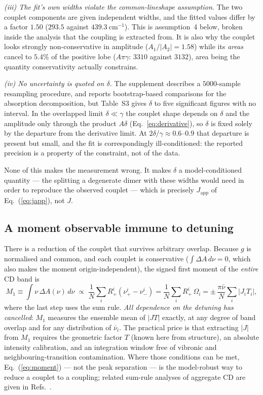 \documentclass[11pt,a4paper]{article}
\begin{document}
\emph{(iii) The fit's own widths violate the common-lineshape assumption.} The
two couplet components are given independent widths, and the fitted values
differ by a factor $1.50$ ($293.5$ against $439.3~\mathrm{cm^{-1}}$). This is
assumption~4 below, broken inside the analysis that the coupling is extracted
from. It is also why the couplet looks strongly non-conservative in amplitude
($A_{1}/|A_{2}|=1.58$) while its \emph{areas} cancel to $5.4\%$ of the positive
lobe ($A\pi\gamma$: $3310$ against $3132$), area being the quantity
conservativity actually constrains.

\emph{(iv) No uncertainty is quoted on $\delta$.} The supplement describes a
$5000$-sample resampling procedure, and reports bootstrap-based comparisons for
the absorption decomposition, but Table~S3 gives $\delta$ to five significant
figures with no interval. In the overlapped limit $\delta\ll\gamma$ the couplet
shape depends on $\delta$ and the amplitude only through the product $A\delta$
(Eq.~\ref{eq:derivative}), so $\delta$ is fixed solely by the departure from
the derivative limit. At $2\delta/\gamma\approx0.6$--$0.9$ that departure is
present but small, and the fit is correspondingly ill-conditioned: the reported
precision is a property of the constraint, not of the data.

None of this makes the measurement wrong. It makes $\delta$ a
model-conditioned quantity --- the splitting a degenerate dimer with these
widths would need in order to reproduce the observed couplet --- which is
precisely $J_{\mathrm{app}}$ of Eq.~(\ref{eq:japp}), not $J$.

\subsection{A moment observable immune to detuning}
\label{sec:moment}

There is a reduction of the couplet that survives arbitrary overlap. Because
$g$ is normalised and common, and each couplet is conservative
($\int\Delta A\,d\nu=0$, which also makes the moment origin-independent), the
signed first moment of the \emph{entire} CD band is
\begin{equation}
M_{1}\equiv\int \nu\,\Delta A(\nu)\,d\nu
\;\propto\;\frac{1}{N}\sum_{i}R^{i}_{+}\left(\nu^{i}_{+}-\nu^{i}_{-}\right)
=\frac{1}{N}\sum_{i}R^{i}_{+}\,\Omega_{i}
=\pm\,\frac{\pi\bar\nu}{N}\sum_{i}|J_{i}T_{i}| ,
\label{eq:moment}
\end{equation}
where the last step uses the sum rule. \emph{All dependence on the detuning
has cancelled}: $M_{1}$ measures the ensemble mean of $|JT|$ exactly, at any
degree of band overlap and for any distribution of $\bar\nu_i$. The practical
price is that extracting $|J|$ from $M_{1}$ requires the geometric factor $T$
(known here from structure), an absolute intensity calibration, and an
integration window free of vibronic and neighbouring-transition
contamination. Where those conditions can be met, Eq.~(\ref{eq:moment}) --- not
the peak separation --- is the model-robust way to reduce a couplet to a
coupling; related sum-rule analyses of aggregate CD are given in
Refs.~\cite{somsen1996,vanamerongen2000}.
\end{document}
